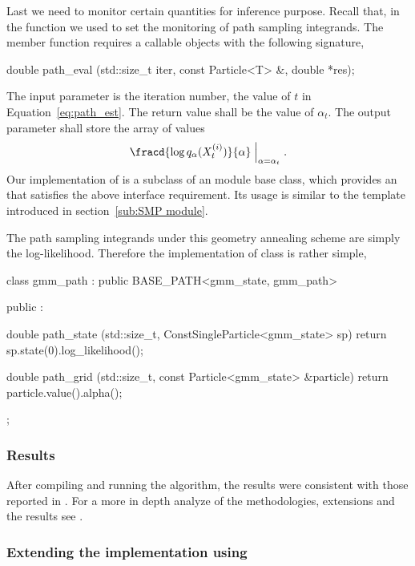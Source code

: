 \documentclass[11pt, bib, hyper, mint, minted=cache]{marticle}
\begin{document}
Last we need to monitor certain quantities for inference purpose. Recall that,
in the  function we used
 to set the monitoring of path
sampling integrands. The  member function requires a
callable objects with the following signature,
\begin{cppcode}
double path_eval (std::size_t iter, const Particle<T> &, double *res);
\end{cppcode}
The input parameter  is the iteration number, the value of $t$
in Equation~\ref{eq:path_est}. The return value shall be the value of
$\alpha_t$. The output parameter  shall store the array of
values
\begin{equation*}
  \fracd{\log q_{\alpha}(X_t^{(i)})}{\alpha}\Bigm|_{\alpha = \alpha_t}.
\end{equation*}
Our implementation of  is a subclass of an \smp module
base class, which provides an  that satisfies the above
interface requirement. Its usage is similar to the 
template introduced in section~\ref{sub:SMP module}.

The path sampling integrands under this geometry annealing scheme are simply
the log-likelihood. Therefore the implementation of  class
is rather simple,
\begin{cppcode}
class gmm_path : public BASE_PATH<gmm_state, gmm_path>
{
    public :

    double path_state (std::size_t, ConstSingleParticle<gmm_state> sp)
    {return sp.state(0).log_likelihood();}

    double path_grid (std::size_t, const Particle<gmm_state> &particle)
    {return particle.value().alpha();}
};
\end{cppcode}

\subsubsection{Results}

After compiling and running the algorithm, the results were consistent with
those reported in \textcite{DelMoral:2006hc}. For a more in depth analyze of
the methodologies, extensions and the results see \textcite{Zhou2013mc}.

\subsubsection{Extending the implementation using \protect\mpi}
\end{document}
